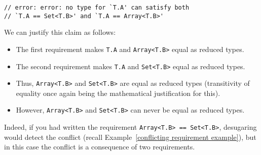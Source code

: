 \documentclass[../generics]{subfiles}
\begin{document}
\begin{example}
\begin{itemize}
\begin{Verbatim}
// error: error: no type for `T.A' can satisfy both
// `T.A == Set<T.B>' and `T.A == Array<T.B>'
\end{Verbatim}
We can justify this claim as follows:
\begin{itemize}
\item The first requirement makes \texttt{T.A} and \texttt{Array<T.B>} equal as reduced types.
\item The second requirement makes \texttt{T.A} and \texttt{Set<T.B>} equal as reduced types.
\item Thus, \texttt{Array<T.B>} and \texttt{Set<T.B>} are equal as reduced types (transitivity of equality once again being the mathematical justification for this).
\item However, \texttt{Array<T.B>} and \texttt{Set<T.B>} can never be equal as reduced types.
\end{itemize}
Indeed, if you had written the requirement \verb|Array<T.B> == Set<T.B>|, desugaring would detect the conflict (recall Example~\ref{conflicting requirement example}), but in this case the conflict is a consequence of two requirements.
\end{itemize}
\end{example}
\end{document}
